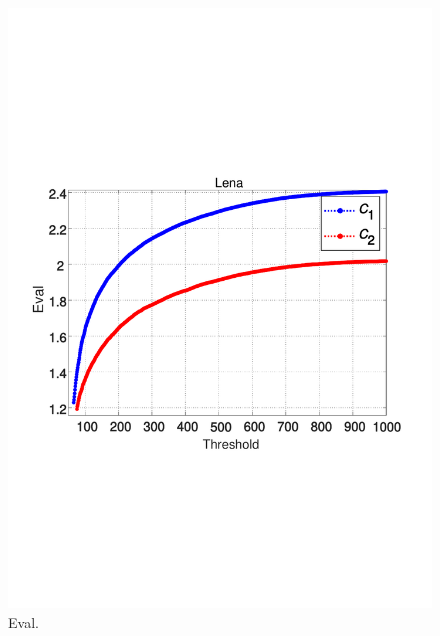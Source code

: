 \documentclass[review,3p,10pt,sort&compress]{elsarticle}
\begin{document}
\begin{figure}
{\begin{minipage}[t]{0.31\linewidth}
    \includegraphics[width=1\textwidth]{figures/thEvalLena.pdf}
    \end{minipage}
}
\centering
\caption{Eval.}
\label{Fig.Eval}
\end{figure}
\end{document}
